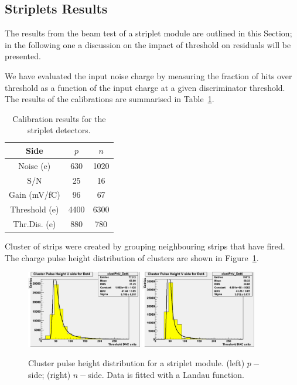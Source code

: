 \subsection{Striplets Results}

The results from the beam test of a striplet module are outlined in this Section; in the following one
a discussion on the impact of threshold on residuals will be presented.

We have evaluated the input noise charge by measuring the fraction of hits over
 threshold as a
function of the input charge at a given discriminator threshold.
The results of the calibrations are summarised in Table~\ref{tab:FSSR2Calib}.


\begin{table}[!hbt]
\begin{center}
\caption{Calibration results for the striplet detectors.
\label{tab:FSSR2Calib}}
\vspace{\baselineskip}
\begin{tabular}{ccc}
\hline

Side & $p$  & $n$ \\

\hline
\hline
Noise (e)& 630       & 1020   \\
S/N      & 25        & 16         \\
Gain (mV/fC)& 96     & 67         \\
Threshold (e) & 4400 & 6300 \\
Thr.Dis. (e)& 880       & 780\\ \hline
\end{tabular}
\end{center}
\end{table}

Cluster of strips were created by grouping neighbouring strips that have fired. The charge pulse height 
distribution of clusters are shown in Figure~\ref{fig:clu_ph_striplets}.
\begin{figure}[!htpb]
\centering
\includegraphics[width=0.45\textwidth]{p_side_striplets.png}
\includegraphics[width=0.45\textwidth]{n_side_striplets.png}
\caption{\label{fig:clu_ph_striplets}Cluster pulse height distribution for a striplet module. (left) $p-$ side; 
(right) $n-$side. Data is fitted with a Landau function.}
\end{figure}

